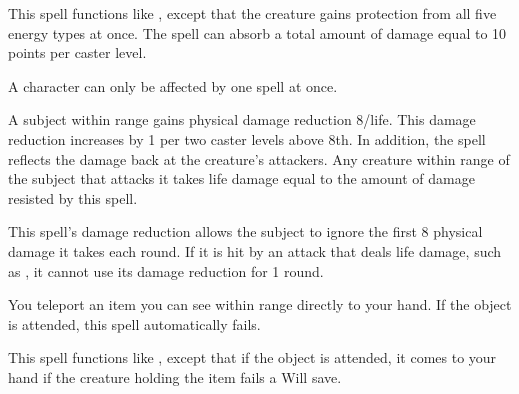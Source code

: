 \begin{spelleffect}
  This spell functions like , except that the creature gains protection from all five energy types at once. The spell can absorb a total amount of damage equal to 10 points per caster level.
\end{spelleffect}
\begin{spellnotes}
  A character can only be affected by one  spell at once.
\end{spellnotes}

\spellrng{\rngclose/\rngmed}
\spelldur{\durshort}
\begin{spelleffect}
  A subject within \rngclose range gains physical damage reduction 8/life. This damage reduction increases by 1 per two caster levels above 8th. In addition, the spell reflects the damage back at the creature's attackers. Any creature within \rngmed range of the subject that attacks it takes life damage equal to the amount of damage resisted by this spell.
\end{spelleffect}
\begin{spellnotes}
  This spell's damage reduction allows the subject to ignore the first 8 physical damage it takes each round. If it is hit by an attack that deals life damage, such as , it cannot use its damage reduction for 1 round.
\end{spellnotes}

\spellrng{\rngclose}
\begin{spelleffect}
  You teleport an item you can see within range directly to your hand. If the object is attended, this spell automatically fails.
\end{spelleffect}

\spellrng{\rngmed}
\begin{spelleffect}
  This spell functions like , except that if the object is attended, it comes to your hand if the creature holding the item fails a Will save.
\end{spelleffect}

